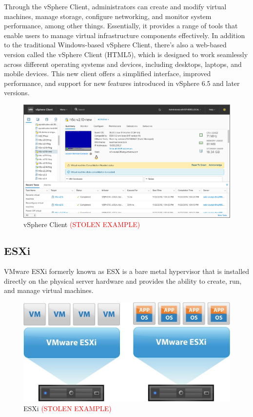 Through the vSphere Client, administrators can create and modify virtual machines, manage storage, configure networking, and monitor system performance, among other things. Essentially, it provides a range of tools that enable users to manage virtual infrastructure components effectively. In addition to the traditional Windows-based vSphere Client, there's also a web-based version called the vSphere Client (HTML5), which is designed to work seamlessly across different operating systems and devices, including desktops, laptops, and mobile devices. This new client offers a simplified interface, improved performance, and support for new features introduced in vSphere 6.5 and later versions.

\begin{figure}[H]
    \centering
    \includegraphics[scale = 0.9]{images/vsphere-client.jpg}
    \caption{vSphere Client \textcolor{red}{(STOLEN EXAMPLE)} }
    \label{vSphere Client}
\end{figure}

\subsection{ESXi}
VMware ESXi formerly known as ESX is a bare metal hypervisor that is installed directly on the physical server hardware and provides the ability to create, run, and manage virtual machines.

\begin{figure}[H]
    \centering
    \includegraphics[scale = 0.55]{images/esxi.jpg}
    \caption{ESXi \textcolor{red}{(STOLEN EXAMPLE)} }
    \label{ESXi}
\end{figure}

